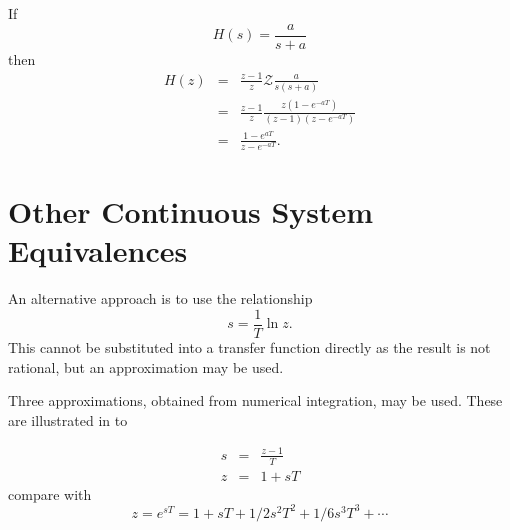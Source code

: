 \begin{slide}\label{slide:l11s10}
\end{slide}

\begin{slide}\label{slide:l11s11}
  If \[H(s) = \frac{a}{s+a}\] then
  \begin{eqnarray*}
    H(z) &=& \frac{z-1}{z}\mathcal{Z} \frac{a}{s(s+a)}\\
         &=& \frac{z-1}{z} \frac{z(1-e^{-aT})}{(z-1)(z-e^{-aT})}\\
         &=& \frac{1-e^{aT}}{z-e^{-aT}}.
  \end{eqnarray*}
\end{slide}

\section*{Other Continuous System Equivalences}

An alternative approach is to use the relationship \[ s  = \frac{1}{T}
\ln z. \] This cannot be substituted into a transfer function directly
as the result is not rational, but an approximation may be used. 

Three approximations, obtained from numerical integration, may be
used. These are illustrated in  to 

\begin{slide}\label{slide:l11s20}
  
  \begin{eqnarray*}
     s &=& \frac{z-1}{T} \\
     z &=& 1 + sT
  \end{eqnarray*}
  compare with $$z = e^{sT} = 1 + sT + 1/2 s^2T^2 + 1/6 s^3T^3 + \cdots$$
\end{slide}

